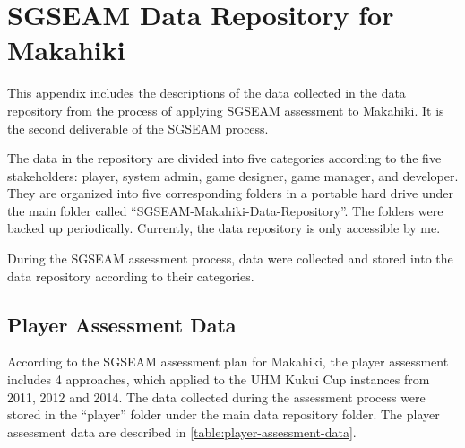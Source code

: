 \chapter{SGSEAM Data Repository for Makahiki}
\label{app:makahiki-data-repository}

This appendix includes the descriptions of the data collected in the data repository from the process of applying SGSEAM assessment to Makahiki. It is the second deliverable of the SGSEAM process. 

The data in the repository are divided into five categories according to the five stakeholders: player, system admin, game designer, game manager, and developer. They are organized into five corresponding folders in a portable hard drive under the main folder called ``SGSEAM-Makahiki-Data-Repository''. The folders were backed up periodically. Currently, the data repository is only accessible by me. 

During the SGSEAM assessment process, data were collected and stored into the data repository according to their categories.

\section{Player Assessment Data}

According to the SGSEAM assessment plan for Makahiki, the player assessment includes 4 approaches, which applied to the UHM Kukui Cup instances from 2011, 2012 and 2014. The data collected during the assessment process were stored in the ``player'' folder under the main data repository folder. The player assessment data are described in \autoref{table:player-assessment-data}.


